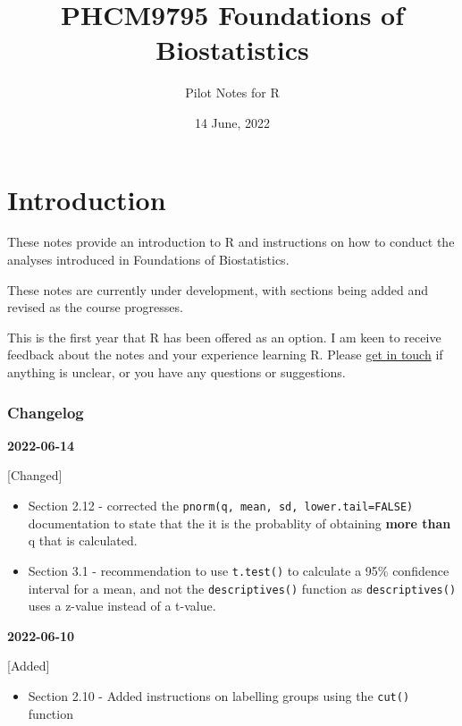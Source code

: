 \documentclass[
]{memoir}
\title{PHCM9795 Foundations of Biostatistics}
\author{Pilot Notes for R}
\date{14 June, 2022}
\providecommand{\tightlist}{%
  \setlength{\itemsep}{0pt}\setlength{\parskip}{0pt}}
\begin{document}
\maketitle

{
\setcounter{tocdepth}{1}
\tableofcontents
}
\hypertarget{introduction}{%
\chapter*{Introduction}\label{introduction}}

These notes provide an introduction to R and instructions on how to conduct the analyses introduced in Foundations of Biostatistics.

These notes are currently under development, with sections being added and revised as the course progresses.

This is the first year that R has been offered as an option. I am keen to receive feedback about the notes and your experience learning R. Please \href{mailto:t.dobbins@unsw.edu.au}{get in touch} if anything is unclear, or you have any questions or suggestions.

\hypertarget{changelog}{%
\subsection*{Changelog}\label{changelog}}

\textbf{2022-06-14}

{[}Changed{]}

\begin{itemize}
\item
  Section 2.12 - corrected the \texttt{pnorm(q,\ mean,\ sd,\ lower.tail=FALSE)} documentation to state that the it is the probablity of obtaining \textbf{more than} q that is calculated.
\item
  Section 3.1 - recommendation to use \texttt{t.test()} to calculate a 95\% confidence interval for a mean, and not the \texttt{descriptives()} function as \texttt{descriptives()} uses a z-value instead of a t-value.
\end{itemize}

\textbf{2022-06-10}

{[}Added{]}

\begin{itemize}
\tightlist
\item
  Section 2.10 - Added instructions on labelling groups using the \texttt{cut()} function
\end{itemize}
\end{document}
